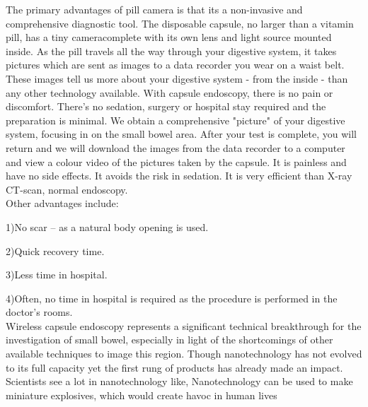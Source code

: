 \documentclass[a4paper,12pt]{article}
\begin{document}
The primary advantages of pill camera is that its a non-invasive and comprehensive diagnostic tool. The
disposable capsule, no larger than a vitamin pill, has a tiny cameracomplete with its own lens and light source
mounted inside. As the pill travels all the way through your digestive system, it takes pictures which are sent
as images to a data recorder you wear on a waist belt. These images tell us more about your digestive system -
from the inside - than any other technology available.
With capsule endoscopy, there is no pain or discomfort. There's no sedation, surgery or hospital stay required
and the preparation is minimal. We obtain a comprehensive "picture" of your digestive system, focusing in on
the small bowel area. After your test is complete, you will return and we will download the images from the
data recorder to a computer and view a colour video of the pictures taken by the capsule. It is painless and have
no side effects. It avoids the risk in sedation. It is very efficient than X-ray CT-scan, normal endoscopy.
\\

Other advantages include:

1)No scar – as a natural body opening is used.

2)Quick recovery time.

3)Less time in hospital.

4)Often, no time in hospital is required as the procedure is performed in the doctor’s rooms.
\\

Wireless capsule endoscopy represents a significant technical breakthrough for the investigation of small
bowel, especially in light of the shortcomings of other available techniques to image this region. Though
nanotechnology has not evolved to its full capacity yet the first rung of products has already made an impact. Scientists see a lot in nanotechnology like,
Nanotechnology can be used to make miniature explosives, which would create havoc in human lives
\end{document}
